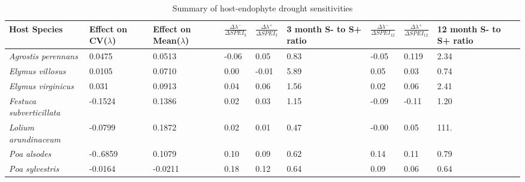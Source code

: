 \documentclass[lineno, sn-basic]{sn-jnl}%
\begin{document}
\begin{table}\centering
	\caption{Summary of host-endophyte drought sensitivities}
	\begin{tabular}{lp{1.4cm}p{1.4cm}p{1.5cm}p{1.5cm}p{1.5cm}p{1.5cm}p{1.5cm}p{1.5cm}}
		Host Species& \raggedright Effect on CV($\lambda$)&\raggedright Effect on Mean($\lambda$)&$\frac{\Delta\lambda^{-}}{\Delta SPEI_{3}}$ & $\frac{\Delta\lambda^{+}}{\Delta SPEI_{3}}$ &3 month S- to S+ ratio&$\frac{\Delta\lambda^{-}}{\Delta SPEI_{12}}$ &$\frac{\Delta\lambda^{+}}{\Delta SPEI_{12}}$ & 12 month S- to S+ ratio\\
		\midrule
		\emph{Agrostis perennans} &0.0475&0.0513&-0.06&0.05&0.83&-0.05&0.119&2.34\\
		\emph{Elymus villosus} &0.0105&0.0710&0.00&-0.01&5.89&0.05&0.03&0.74\\
		\emph{Elymus virginicus} &0.031&0.0913&0.04&0.06&1.56&0.02&0.06&2.41\\
		\emph{Festuca subverticillata} &-0.1524&0.1386&0.02&0.03&1.15&-0.09&-0.11&1.20\\
		\emph{Lolium arundinaceum} &-0.0799&0.1872&0.02&0.01&0.47&-0.00&0.05&111.\\
		\emph{Poa alsodes} &-0..6859&0.1079&0.10&0.09&0.62&0.14&0.11&0.79\\
		\emph{Poa sylvestris}&-0.0164&-0.0211&0.18&0.12&0.64&0.09&0.06&0.64\\
		\bottomrule
	\end{tabular}
\end{table}


\newpage
\end{document}
